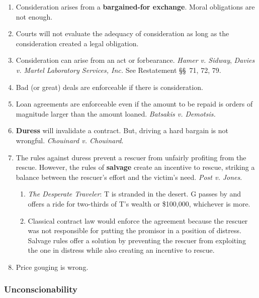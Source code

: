 \begin{enumerate}
    \item Consideration arises from a \textbf{bargained-for exchange}. Moral 
    obligations are not enough.
    \item Courts will not evaluate the adequacy of consideration as long as 
    the consideration created a legal obligation.
    \item Consideration can arise from an act or forbearance. \emph{Hamer v. 
    Sidway}, \emph{Davies v. Martel Laboratory Services, Inc.} See Restatement 
    \S\S\ 71, 72, 79.
    \item Bad (or great) deals are enforceable if there is consideration.
    \item Loan agreements are enforceable even if the amount to be repaid is 
    orders of magnitude larger than the amount loaned. \emph{Batsakis v. 
    Demotsis.}
    \item \textbf{Duress} will invalidate a contract. But, driving a hard 
    bargain is not wrongful. \emph{Chouinard v. Chouinard}.
    \item The rules against duress prevent a rescuer from unfairly profiting 
    from the rescue. However, the rules of \textbf{salvage} create an 
    incentive to rescue, striking a balance between the rescuer's effort and 
    the victim's need. \emph{Post v. Jones}.
    \begin{enumerate}
        \item \emph{The Desperate Traveler}: T is stranded in the desert. G 
        passes by and offers a ride for two-thirds of T's wealth or \$100,000, 
        whichever is more.
        \item Classical contract law would enforce the agreement because the 
        rescuer was not responsible for putting the promisor in a position of 
        distress. Salvage rules offer a solution by preventing the rescuer 
        from exploiting the one in distress while also creating an incentive 
        to rescue.
    \end{enumerate}
    \item Price gouging is wrong.
\end{enumerate}

\subsubsection{Unconscionability}

